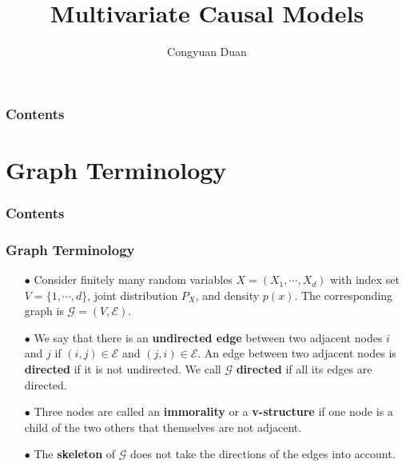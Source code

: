 \documentclass{beamer}
\title{Multivariate Causal Models}
\author{Congyuan Duan}
\begin{document}
\frame{\titlepage}

\begin{frame}
    \frametitle{Contents}
    \tableofcontents
\end{frame}

\section{Graph Terminology}

\begin{frame}
    \frametitle{Contents}
    \tableofcontents[currentsection]
\end{frame}

\begin{frame}
    \frametitle{Graph Terminology} 
    \begin{itemize}
        \item[$\bullet$] Consider finitely many random variables $X = (X_1,\cdots,X_d)$ with index set $V=\{1,\cdots,d\}$, 
        joint distribution $P_X$, and density $p(x)$. The corresponding graph is $\mathcal{G} = (V,\mathcal{E})$.
        \item[$\bullet$] We say that there is an \textbf{undirected edge} between two adjacent nodes $i$ and $j$ if 
        $(i,j)\in \mathcal{E}$ and $(j,i)\in \mathcal{E}$. An edge between two adjacent nodes is \textbf{directed} if it is not 
        undirected. We call $\mathcal{G}$ \textbf{directed} if all its edges are directed.
        \item[$\bullet$] Three nodes are called an \textbf{immorality} or a \textbf{v-structure} if one node is a child 
        of the two others that themselves are not adjacent.
        \item[$\bullet$] The \textbf{skeleton} of $\mathcal{G}$ does not take the directions of the edges into account. 
    \end{itemize}
\end{frame}
\end{document}

